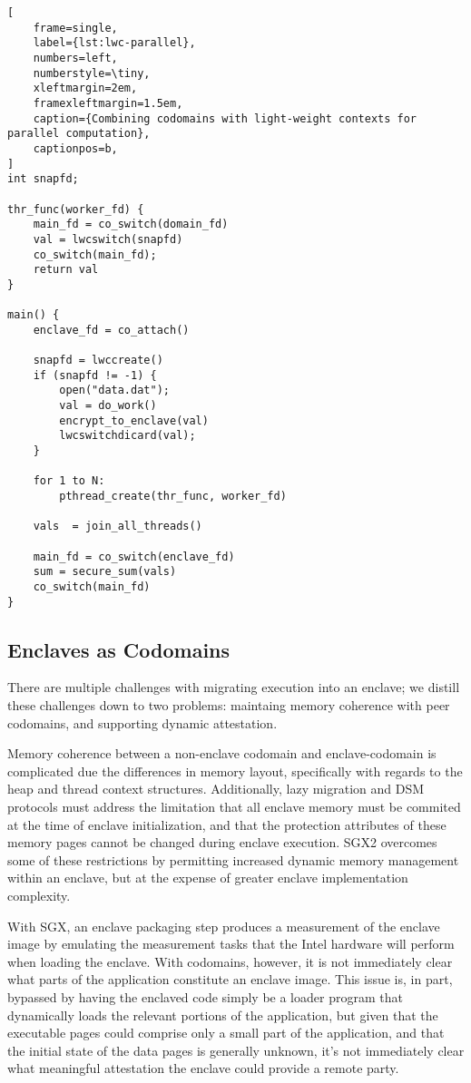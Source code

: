 \begin{lstlisting}[
    frame=single,
    label={lst:lwc-parallel},
    numbers=left,
    numberstyle=\tiny,
    xleftmargin=2em,
    framexleftmargin=1.5em,
    caption={Combining codomains with light-weight contexts for parallel computation},
    captionpos=b,
]
int snapfd;

thr_func(worker_fd) {
    main_fd = co_switch(domain_fd)
    val = lwcswitch(snapfd)
    co_switch(main_fd);
    return val
}

main() {
    enclave_fd = co_attach()

    snapfd = lwccreate()
    if (snapfd != -1) {
        open("data.dat");
        val = do_work()
        encrypt_to_enclave(val)
        lwcswitchdicard(val);
    } 

    for 1 to N:
        pthread_create(thr_func, worker_fd)
            
    vals  = join_all_threads()
     
    main_fd = co_switch(enclave_fd)
    sum = secure_sum(vals)
    co_switch(main_fd)
}
\end{lstlisting}


\subsection{Enclaves as Codomains}
\label{sec:enclaves-as-codomains}

There are multiple challenges with migrating execution into an enclave; we
distill these challenges down to two problems: maintaing memory coherence with
peer codomains, and supporting dynamic attestation.


Memory coherence between a non-enclave codomain and enclave-codomain is
complicated due the differences in memory layout, specifically with regards to
the heap and thread context structures.
%
Additionally, lazy migration and DSM protocols must address the limitation that
all enclave memory must be commited at the time of enclave initialization, and
that the protection attributes of these memory pages cannot be changed during
enclave execution.
%
SGX2 overcomes some of these restrictions by permitting increased dynamic memory
management within an enclave, but at the expense of greater enclave
implementation complexity.
%

With SGX, an enclave packaging step produces a measurement of the enclave image by
emulating the measurement tasks that the Intel hardware will perform when
loading the enclave.
%
With codomains, however, it is not immediately clear what parts of the
application constitute an enclave image.
%
This issue is, in part, bypassed by having the enclaved code simply be a loader
program that dynamically loads the relevant portions of the application, but
given that the executable pages could comprise only a small part of the
application, and that the initial state of the data pages is generally unknown,
it's not immediately clear what meaningful attestation the enclave could
provide a remote party.


